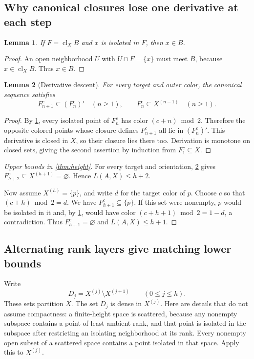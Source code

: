 \documentclass[11pt,letterpaper]{article}
\numberwithin{equation}{section}
\newtheorem{lemma}[lemma]{Lemma}
\theoremstyle{definition}
\theoremstyle{remark}
\theoremstyle{definition}
\newcommand{\cl}{\operatorname{cl}}
\begin{document}
\subsection{Why canonical closures lose one derivative at each step}

\begin{lemma}\label{lem:isolation}
If $F=\cl_X B$ and $x$ is isolated in $F$, then $x\in B$.
\end{lemma}
\begin{proof}
An open neighborhood $U$ with $U\cap F=\{x\}$ must meet $B$, because
$x\in\cl_X B$. Thus $x\in B$.
\end{proof}

\begin{lemma}[Derivative descent]\label{lem:descent}
For every target and outer color, the canonical sequence satisfies
\begin{equation}\label{eq:descent}
 F^c_{n+1}\subseteq(F^c_n)'\quad(n\geq1),
 \qquad F^c_n\subseteq X^{(n-1)}\quad(n\geq1).
\end{equation}
\end{lemma}
\begin{proof}
By \cref{lem:isolation}, every isolated point of $F^c_n$ has color
$(c+n)\bmod2$. Therefore the opposite-colored points whose closure defines
$F^c_{n+1}$ all lie in $(F^c_n)'$. This derivative is closed in $X$, so their
closure lies there too. Derivation is monotone on closed sets, giving the
second assertion by induction from $F^c_1\subseteq X$.
\end{proof}

\begin{proof}[Upper bounds in \cref{thm:height}]
For every target and orientation, \cref{lem:descent} gives
$F^c_{h+2}\subseteq X^{(h+1)}=\varnothing$. Hence $L(A,X)\leq h+2$.

Now assume $X^{(h)}=\{p\}$, and write $d$ for the target color of $p$.
Choose $c$ so that $(c+h)\bmod2=d$. We have $F^c_{h+1}\subseteq\{p\}$.
If this set were nonempty, $p$ would be isolated in it and, by
\cref{lem:isolation}, would have color $(c+h+1)\bmod2=1-d$, a contradiction.
Thus $F^c_{h+1}=\varnothing$ and $L(A,X)\leq h+1$.
\end{proof}

\subsection{Alternating rank layers give matching lower bounds}

Write
\[
 D_j=X^{(j)}\setminus X^{(j+1)}\qquad(0\leq j\leq h).
\]
These sets partition $X$. The set $D_j$ is dense in $X^{(j)}$. Here are details
that do not assume compactness: a finite-height space is scattered, because any
nonempty subspace contains a point of least ambient rank, and that point is
isolated in the subspace after restricting an isolating neighborhood at its rank.
Every nonempty open subset of a scattered space contains a point isolated in
that space. Apply this to $X^{(j)}$.
\end{document}
